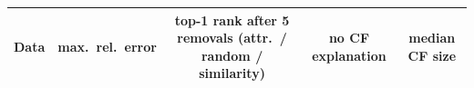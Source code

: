 \begin{tabular}{lcccc}
\toprule
Data & max.\ rel.\ error & top-1 rank after 5 removals (attr.\ / random / similarity) & no CF explanation & median CF size\\
\midrule
\bottomrule
\end{tabular}
